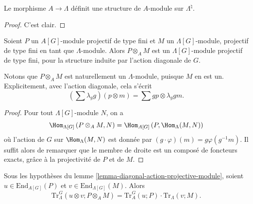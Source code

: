 \begin{lemma}
\label{lemma-A-module-structure}
Le morphisme $A\to \Lambda$ définit une structure de $A$-module sur $\Lambda^\natural$.
\end{lemma}

\begin{proof}
C'est clair.
\end{proof}

\begin{lemma}
\label{lemma-diagonal-action-projective-module}
Soient $P$ un $A[G]$-module projectif de type fini et $M$ un $\Lambda[G]$-module,
projectif de type fini en tant que $\Lambda$-module. Alors $P \otimes_A M$ est un
$\Lambda[G]$-module projectif de type fini, pour la structure induite par l'action
diagonale de $G$.
\end{lemma}

\noindent
Notons que $P \otimes_A M$ est naturellement un $\Lambda$-module, puisque $M$ en est un.
Explicitement, avec l'action diagonale, cela s'écrit
$$
\left(\sum\lambda_g g\right)\left(p \otimes m\right)
=
\sum g p \otimes \lambda_g g m.
$$

\begin{proof}
Pour tout $\Lambda[G]$-module $N$, on a
$$
\Hom_{\Lambda[G]}\left(P \otimes_A M, N\right)= \Hom_{A[G]}\left(P,
\Hom_{\Lambda}(M, N)\right)
$$
où l'action de $G$ sur $\Hom_{\Lambda}(M, N)$ est donnée par $(g\cdot
\varphi)(m) = g \varphi (g^{-1} m) $. Il suffit alors de remarquer que le
membre de droite est un composé de foncteurs exacts, grâce à la projectivité
de $P$ et de $M$.
\end{proof}

\begin{lemma}
\label{lemma-multiplicative-trace}
Sous les hypothèses du
lemme \ref{lemma-diagonal-action-projective-module},
soient
$u\in \text{End}_{A[G]}(P)$ et $v\in \text{End}_{\Lambda[G]}(M)$. Alors
$$
\text{Tr}_\Lambda^G \left(u \otimes v; P \otimes_A M\right) = \text{Tr}_A^G(u;
P)\cdot \text{Tr}_\Lambda(v;M).
$$
\end{lemma}

